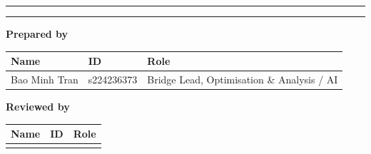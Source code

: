 \begin{titlepage}
\thispagestyle{empty}
\centering

\vspace*{1.0cm}

{\Large\scshape \projectname\par}
\vspace{0.4em}
{\large \projectunit\par}

\vfill

{\color{rulecol}\rule{\textwidth}{1.5pt}}\par
\vspace{1.2em}
{\huge\bfseries \doctitle\par}
\vspace{0.9em}
{\large\itshape \docsubtitle\par}
\vspace{1.2em}
{\color{rulecol}\rule{\textwidth}{1.5pt}}\par

\vspace{1.6cm}

{\large\bfseries Prepared by\par}
\vspace{0.9em}
\begin{tabularx}{0.92\textwidth}{@{}l l L@{}}
  \toprule
  \textbf{Name} & \textbf{ID} & \textbf{Role} \\
  \midrule
  Bao Minh Tran & s224236373 & Bridge Lead, Optimisation \& Analysis / AI \\
  \bottomrule
\end{tabularx}

\vspace{1.0cm}

{\large\bfseries Reviewed by\par}
\vspace{0.9em}
\begin{tabularx}{0.92\textwidth}{@{}l l L@{}}
  \toprule
  \textbf{Name} & \textbf{ID} & \textbf{Role} \\
  \midrule
   &  &  \\
  \bottomrule
\end{tabularx}


\end{titlepage}
